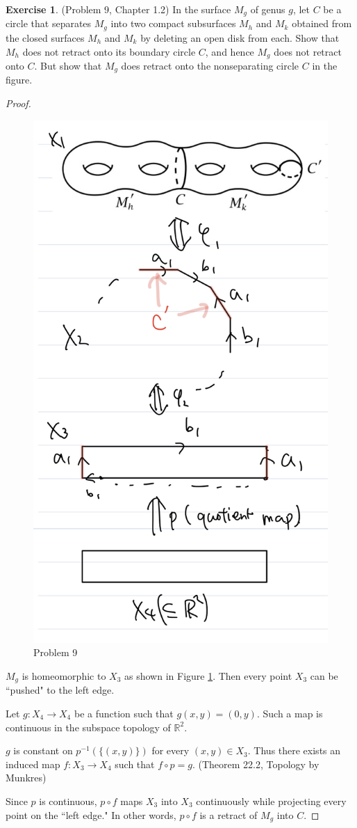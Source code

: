 \documentclass[12pt, psamsfonts]{amsart}
\theoremstyle{definition}
\newtheorem*{exer}{Exercise}
\theoremstyle{remark}
\numberwithin{equation}{section}
\begin{document}
\begin{exer}{(Problem 9, Chapter 1.2)}
  In the surface $M_g$ of genus $g$, let $C$ be a circle that separates $M_g$ into two compact subsurfaces $M_h$ and $M_k$ obtained from the closed surfaces $M_h$ and $M_k$ by deleting an open disk from each.
  Show that $M_h$ does not retract onto its boundary circle $C$, and hence $M_g$ does not retract onto $C$.
  But show that $M_g$ does retract onto the nonseparating circle $C$ in the figure.
\end{exer}

\begin{proof}
  \begin{figure}
    \includegraphics[width=.5\linewidth]{problem9_retract.jpeg}
      \caption{Problem 9}
    \label{fig:gtorus}
  \end{figure}
  $M_g$ is homeomorphic to $X_3$ as shown in Figure \ref{fig:gtorus}.
  Then every point $X_3$ can be ``pushed" to the left edge.

  Let $g: X_4 \rightarrow X_4$ be a function such that $g(x, y) = (0, y)$.
  Such a map is continuous in the subspace topology of $\mathbb{R}^2$.

  $g$ is constant on $p^{-1}(\{ (x, y) \})$ for every $(x, y) \in X_3$.
  Thus there exists an induced map $f: X_3 \rightarrow X_4$ such that $f \circ p = g$.
  (Theorem 22.2, Topology by Munkres)

  Since $p$ is continuous, $p \circ f$ maps $X_3$ into $X_3$ continuously while projecting every point on the ``left edge."
  In other words, $p \circ f$ is a retract of $M_g$ into $C$.
\end{proof}
\end{document}
